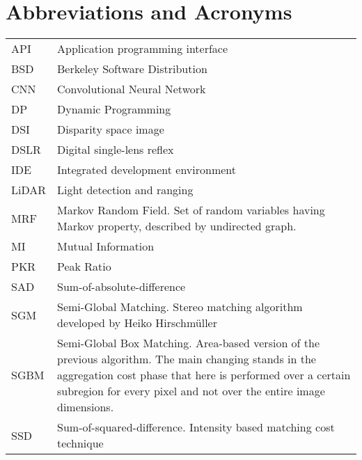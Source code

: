 \chapter*{Abbreviations and Acronyms}


\noindent
\begin{longtable}{@{}p{}p{}@{}}
API & Application programming interface \\
BSD & Berkeley Software Distribution \\
CNN & Convolutional Neural Network \\
DP & Dynamic Programming \\
DSI & Disparity space image \\
DSLR & Digital single-lens reflex \\
IDE & Integrated development environment \\
LiDAR & Light detection and ranging \\
MRF & Markov Random Field. Set of random variables having Markov property, described by undirected graph. \\ 
MI & Mutual Information \\
PKR & Peak Ratio \\
SAD & Sum-of-absolute-difference \\
SGM & Semi-Global Matching. Stereo matching algorithm developed by Heiko Hirschm\"{u}ller \\
SGBM & Semi-Global Box Matching. Area-based version of the previous algorithm. The main changing stands in the aggregation cost phase that here is performed over a certain subregion for every pixel and not over the entire image dimensions.\\
SSD & Sum-of-squared-difference. Intensity based matching cost technique\\
\end{longtable}
